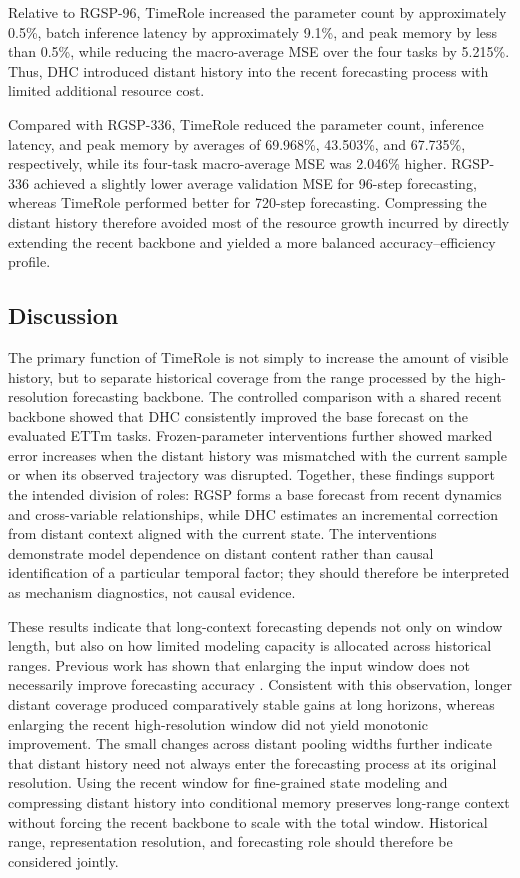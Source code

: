 Relative to RGSP-96, TimeRole increased the parameter count by approximately 0.5\%, batch inference latency by approximately 9.1\%, and peak memory by less than 0.5\%, while reducing the macro-average MSE over the four tasks by 5.215\%. Thus, DHC introduced distant history into the recent forecasting process with limited additional resource cost.

Compared with RGSP-336, TimeRole reduced the parameter count, inference latency, and peak memory by averages of 69.968\%, 43.503\%, and 67.735\%, respectively, while its four-task macro-average MSE was 2.046\% higher. RGSP-336 achieved a slightly lower average validation MSE for 96-step forecasting, whereas TimeRole performed better for 720-step forecasting. Compressing the distant history therefore avoided most of the resource growth incurred by directly extending the recent backbone and yielded a more balanced accuracy--efficiency profile.

\subsection{Discussion}

The primary function of TimeRole is not simply to increase the amount of visible history, but to separate historical coverage from the range processed by the high-resolution forecasting backbone. The controlled comparison with a shared recent backbone showed that DHC consistently improved the base forecast on the evaluated ETTm tasks. Frozen-parameter interventions further showed marked error increases when the distant history was mismatched with the current sample or when its observed trajectory was disrupted. Together, these findings support the intended division of roles: RGSP forms a base forecast from recent dynamics and cross-variable relationships, while DHC estimates an incremental correction from distant context aligned with the current state. The interventions demonstrate model dependence on distant content rather than causal identification of a particular temporal factor; they should therefore be interpreted as mechanism diagnostics, not causal evidence.

These results indicate that long-context forecasting depends not only on window length, but also on how limited modeling capacity is allocated across historical ranges. Previous work has shown that enlarging the input window does not necessarily improve forecasting accuracy \citep{Zhang2025MEW}. Consistent with this observation, longer distant coverage produced comparatively stable gains at long horizons, whereas enlarging the recent high-resolution window did not yield monotonic improvement. The small changes across distant pooling widths further indicate that distant history need not always enter the forecasting process at its original resolution. Using the recent window for fine-grained state modeling and compressing distant history into conditional memory preserves long-range context without forcing the recent backbone to scale with the total window. Historical range, representation resolution, and forecasting role should therefore be considered jointly.

